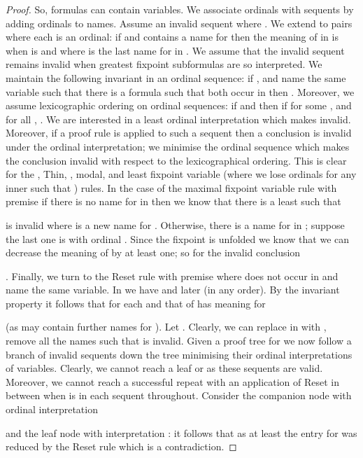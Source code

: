 \documentclass[copyright,creativecommons]{eptcs}
\begin{document}
\begin{proof}
So, formulas can contain variables. 
We  associate ordinals
with sequents by adding ordinals to names. Assume an invalid
sequent  where .
We extend  to pairs 
where each  is an ordinal: if 
and  contains a name for  then the meaning of 
in  is  when  is 
and  where  is the 
last name for  in . We assume that the invalid sequent
 remains invalid when greatest
fixpoint subformulas are so interpreted.
We maintain the following invariant in an ordinal sequence:
if ,  and 
 name the same variable  such that there is a formula
 such that  both occur in  then 
. Moreover, we assume lexicographic ordering on 
ordinal sequences: if 
and  then
 if for some ,  and for 
all , .  We are interested
in a least ordinal interpretation which makes   
invalid. Moreover, if a proof rule is applied to such a sequent
then a conclusion is invalid under the ordinal interpretation;
we minimise the ordinal sequence which makes the conclusion invalid with 
respect to the lexicographical ordering.  
This is clear for the , Thin, , modal, 
and least fixpoint variable  
(where we lose ordinals for any inner  such that ) rules.  
In the case of the maximal fixpoint variable  rule with premise 
 if there is no name for  in  then we know that
there is a least  such that 

is invalid where  is a new name for . Otherwise,  there is a name
for  in ; suppose the last one is  with ordinal .
Since the fixpoint is unfolded we know that we can decrease the meaning
of  by at least one; so for the invalid   conclusion 

.  Finally, we turn to the Reset rule with
premise  where  does not occur in 
and  name the same variable.
In   we have  and later  (in any order). By the invariant property
it follows that  for each  and that 
 of  has meaning  for 

(as  may contain further names for ). Let . Clearly, we can
replace  in  with , remove all the names
 such that 
is invalid.  Given a proof tree for  we now follow a branch
of invalid sequents down the tree minimising their ordinal
interpretations of variables. Clearly, we cannot reach a leaf  or  as these sequents are valid.
Moreover, we cannot reach a successful repeat  with
an application of Reset in between when   is in each sequent 
throughout.
Consider the companion node with ordinal interpretation 

and the leaf node with interpretation : it follows that  as at least the entry for 
was reduced by the Reset rule which is a contradiction. 
\end{proof}
\end{document}
